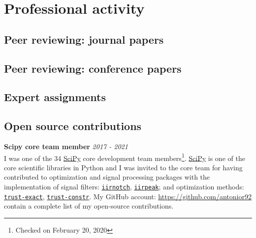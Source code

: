\documentclass[10pt,letterpaper]{article} %
\begin{document}
{{{{{{{{{{{{\section*{Professional activity}

\subsection*{Peer reviewing: journal papers}

{%

\subsection*{Peer reviewing: conference papers}

{%

\subsection*{Expert assignments}

{%

\subsection*{Open source contributions}

{\bf Scipy  core team member} \hfill {\em 2017 - 2021} \\
I was one of the 34 \href{https://www.scipy.org}{SciPy} core development  team members\footnote{Checked on February 20, 2020}.
\href{https://www.scipy.org}{SciPy} is one of the core scientific libraries in Python and I was invited to the core team
for having contributed to optimization and signal processing packages with the implementation of signal filters:
\href{http://scipy.github.io/devdocs/generated/scipy.signal.iirnotch.html}{\texttt{iirnotch}},
    \href{http://scipy.github.io/devdocs/generated/scipy.signal.iirpeak.html}{\texttt{iirpeak}};
    and optimization methods: \href{http://scipy.github.io/devdocs/optimize.minimize-trustexact.html}{\texttt{trust-exact}}, \href{http://scipy.github.io/devdocs/optimize.minimize-trustconstr.html}{\texttt{trust-constr}}. My GitHub account: \href{https://github.com/antonior92}{https://github.com/antonior92} contain a complete list of my open-source contributions.

}}}}}}}}}}}}}}}
\end{document}
